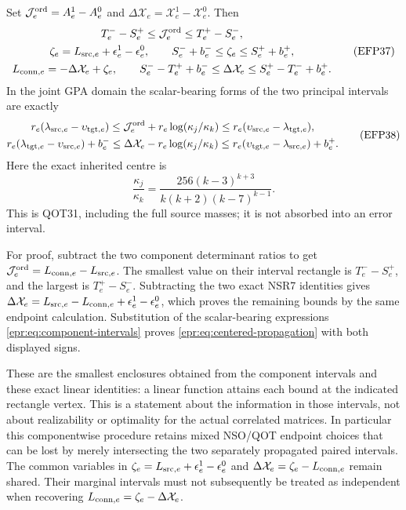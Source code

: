 \documentclass[11pt,a4paper]{article}
\begin{document}
Set $\mathcal J_e^{\rm ord}=A_e^1-A_e^0$ and
$\Delta\mathcal X_e=\mathcal X_e^1-\mathcal X_e^0$. Then
\begin{equation}
\begin{gathered}
 T_e^- -S_e^+\le\mathcal J_e^{\rm ord}\le T_e^+-S_e^-,\\
 \zeta_e=L_{{\rm src},e}+\epsilon_e^1-\epsilon_e^0,\qquad
 S_e^-+b_e^-\le\zeta_e\le S_e^++b_e^+,\\
 L_{{\rm conn},e}=-\Delta\mathcal X_e+\zeta_e,\qquad
 S_e^- -T_e^++b_e^-\le\Delta\mathcal X_e
                         \le S_e^+-T_e^-+b_e^+ .
\end{gathered}
\tag{EFP37}
\label{epr:eq:propagation}
\end{equation}
In the joint GPA domain the scalar-bearing forms of the two principal
intervals are exactly
\begin{equation}
\begin{gathered}
 r_e(\lambda_{{\rm src},e}-\upsilon_{{\rm tgt},e})
 \le \mathcal J_e^{\rm ord}
          +r_e\log(\kappa_j/\kappa_k)
 \le r_e(\upsilon_{{\rm src},e}-\lambda_{{\rm tgt},e}),\\
 r_e(\lambda_{{\rm tgt},e}-\upsilon_{{\rm src},e})+b_e^-
 \le \Delta\mathcal X_e-r_e\log(\kappa_j/\kappa_k)
 \le r_e(\upsilon_{{\rm tgt},e}-\lambda_{{\rm src},e})+b_e^+ .
\end{gathered}
\tag{EFP38}
\label{epr:eq:centered-propagation}
\end{equation}
Here the exact inherited centre is
\[
 \frac{\kappa_j}{\kappa_k}
   =\frac{256(k-3)^{k+3}}{k(k+2)(k-7)^{k-1}} .
\]
This is QOT31, including the full source masses; it is not absorbed
into an error interval.

For proof, subtract the two component determinant ratios to get
$\mathcal J_e^{\rm ord}=L_{{\rm conn},e}-L_{{\rm src},e}$.
The smallest value on their interval rectangle is $T_e^--S_e^+$,
and the largest is $T_e^+-S_e^-$. Subtracting the two exact NSR7
identities gives
$\Delta\mathcal X_e=L_{{\rm src},e}-L_{{\rm conn},e}
+\epsilon_e^1-\epsilon_e^0$, which proves the remaining bounds by
the same endpoint calculation. Substitution of the scalar-bearing
expressions \eqref{epr:eq:component-intervals} proves
\eqref{epr:eq:centered-propagation} with both displayed signs.

These are the smallest enclosures obtained from the component intervals
and these exact linear identities: a linear function attains each bound
at the indicated rectangle vertex. This is a statement about the
information in those intervals, not about realizability or optimality
for the actual correlated matrices. In particular this componentwise
procedure retains mixed NSO/QOT endpoint choices that can be lost by
merely intersecting the two separately propagated paired intervals.
The common variables in
$\zeta_e=L_{{\rm src},e}+\epsilon_e^1-\epsilon_e^0$ and
$\Delta\mathcal X_e=\zeta_e-L_{{\rm conn},e}$ remain shared.
Their marginal intervals must not subsequently be treated as independent
when recovering $L_{{\rm conn},e}=\zeta_e-\Delta\mathcal X_e$.
\end{document}
